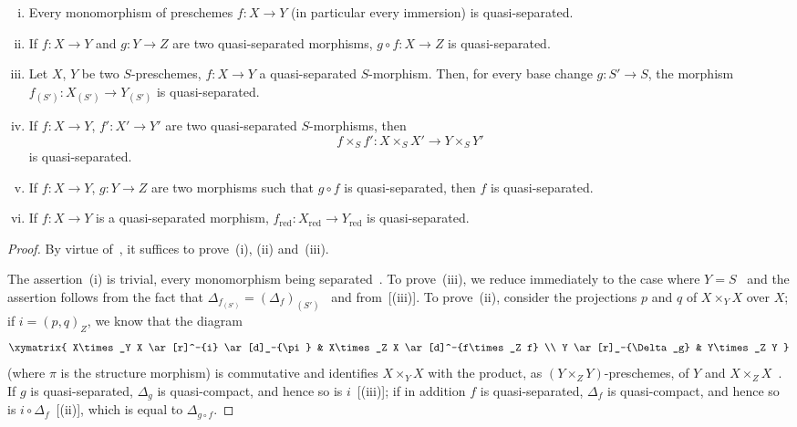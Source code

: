\begin{proposition}[1.2.2]
\label{IV.1.2.2}
\medskip\noindent
\begin{enumerate}[(i)]
  \item Every monomorphism of preschemes $f:X\to Y$ \textnormal{(}in particular
    every immersion\textnormal{)} is quasi-separated.
  \item If $f:X\to Y$ and $g:Y\to Z$ are two quasi-separated morphisms, $g\circ f:X\to Z$ is
    quasi-separated.
  \item Let $X$, $Y$ be two $S$-preschemes, $f:X\to Y$ a quasi-separated $S$-morphism. Then,
    for every base change $g:S'\to S$, the morphism $f_{(S')}:X_{(S')}\to Y_{(S')}$ is quasi-separated.
  \item If $f:X\to Y$, $f':X'\to Y'$ are two quasi-separated $S$-morphisms, then
    \[
      f\times_S f': X\times_S X'\to Y\times_S Y'
    \]
    is quasi-separated.
  \item If $f:X\to Y$, $g:Y\to Z$ are two morphisms such that $g\circ f$ is quasi-separated, then $f$
    is quasi-separated.
  \item If $f:X\to Y$ is a quasi-separated morphism, $f_{\mathrm{red}}:X_{\mathrm{red}}\to Y_{\mathrm{red}}$ is quasi-separated.
\end{enumerate}
\end{proposition}

\begin{proof}
By virtue of~, it suffices to prove~(i), (ii) and~(iii).

The assertion~(i) is trivial, every monomorphism being separated~. To
prove~(iii), we reduce immediately to the case where $Y=S$~ and the assertion follows
from the fact that $\Delta_{f_{(S')}}=(\Delta_f)_{(S')}$~ and from~[(iii)]. To prove~(ii), consider
the projections $p$ and $q$ of $X\times_Y X$ over $X$; if $i=(p,q)_Z$, we know that the diagram
\[
\xymatrix{
  X\times_Y X \ar[r]^-{i} \ar[d]_-{\pi} & X\times_Z X \ar[d]^-{f\times_Z f} \\
  Y \ar[r]_-{\Delta_g} & Y\times_Z Y
}
\]
(where $\pi$ is the structure morphism) is commutative and identifies $X\times_Y X$ with the product,
as $(Y\times_Z Y)$-preschemes, of $Y$ and $X\times_Z X$~. If $g$ is
quasi-separated, $\Delta_g$ is quasi-compact, and hence so is $i$~[(iii)];
if in addition $f$ is quasi-separated, $\Delta_f$ is quasi-compact, and hence so is
$i\circ\Delta_f$~[(ii)], which is equal to $\Delta_{g\circ f}$.
\end{proof}

